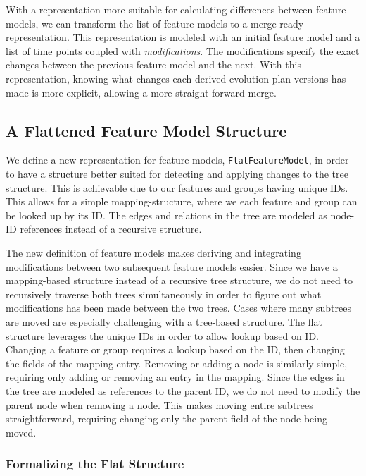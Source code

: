 \documentclass[a4paper,english]{ifimaster}
\begin{document}
With a representation more suitable for calculating differences between feature models, we can transform the list of feature models to a merge-ready representation. This representation is modeled with an initial feature model and a list of time points coupled with \textit{modifications}. The modifications specify the exact changes between the previous feature model and the next. With this representation, knowing what changes each derived evolution plan versions has made is more explicit, allowing a more straight forward merge.

\subsection{A Flattened Feature Model Structure}%
\label{sub:a_flatter_feature_model_structure}

We define a new representation for feature models, \texttt{FlatFeatureModel}, in order to have a structure better suited for detecting and applying changes to the tree structure. This is achievable due to our features and groups having unique IDs. This allows for a simple mapping-structure, where we each feature and group can be looked up by its ID. The edges and relations in the tree are modeled as node-ID references instead of a recursive structure.

The new definition of feature models makes deriving and integrating modifications between two subsequent feature models easier. Since we have a mapping-based structure instead of a recursive tree structure, we do not need to recursively traverse both trees simultaneously in order to figure out what modifications has been made between the two trees. Cases where many subtrees are moved are especially challenging with a tree-based structure. The flat structure leverages the unique IDs in order to allow lookup based on ID. Changing a feature or group requires a lookup based on the ID, then changing the fields of the mapping entry. Removing or adding a node is similarly simple, requiring only adding or removing an entry in the mapping. Since the edges in the tree are modeled as references to the parent ID, we do not need to modify the parent node when removing a node. This makes moving entire subtrees straightforward, requiring changing only the parent field of the node being moved.

\subsubsection{Formalizing the Flat Structure}%
\label{ssub:formalizing_the_flat_structure}
\end{document}

